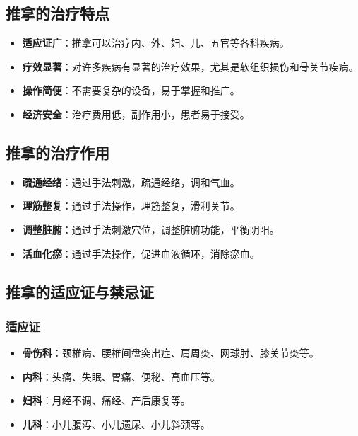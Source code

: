 \documentclass[12pt,UTF8]{ctexbook}
\begin{document}
\subsection{推拿的治疗特点}

\begin{itemize}
\item \textbf{适应证广}：推拿可以治疗内、外、妇、儿、五官等各科疾病。
\item \textbf{疗效显著}：对许多疾病有显著的治疗效果，尤其是软组织损伤和骨关节疾病。
\item \textbf{操作简便}：不需要复杂的设备，易于掌握和推广。
\item \textbf{经济安全}：治疗费用低，副作用小，患者易于接受。
\end{itemize}

\subsection{推拿的治疗作用}

\begin{itemize}
\item \textbf{疏通经络}：通过手法刺激，疏通经络，调和气血。
\item \textbf{理筋整复}：通过手法操作，理筋整复，滑利关节。
\item \textbf{调整脏腑}：通过手法刺激穴位，调整脏腑功能，平衡阴阳。
\item \textbf{活血化瘀}：通过手法操作，促进血液循环，消除瘀血。
\end{itemize}

\subsection{推拿的适应证与禁忌证}

\subsubsection{适应证}

\begin{itemize}
\item \textbf{骨伤科}：颈椎病、腰椎间盘突出症、肩周炎、网球肘、膝关节炎等。
\item \textbf{内科}：头痛、失眠、胃痛、便秘、高血压等。
\item \textbf{妇科}：月经不调、痛经、产后康复等。
\item \textbf{儿科}：小儿腹泻、小儿遗尿、小儿斜颈等。
\end{itemize}
\end{document}
